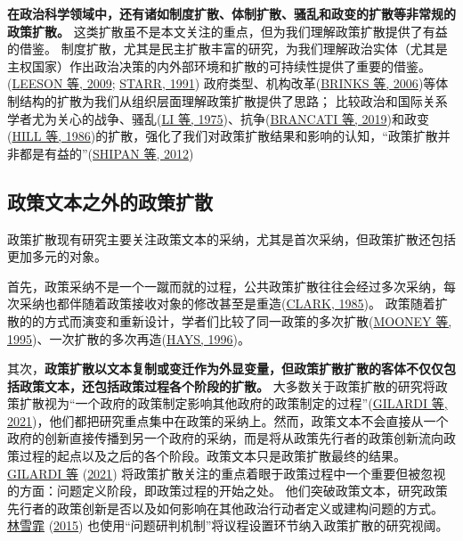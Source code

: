 \documentclass[
  12pt,
]{ctexart}
\begin{document}
\textbf{在政治科学领域中，还有诸如制度扩散、体制扩散、骚乱和政变的扩散等非常规的政策扩散。}
这类扩散虽不是本文关注的重点，但为我们理解政策扩散提供了有益的借鉴。
制度扩散，尤其是民主扩散丰富的研究，为我们理解政治实体（尤其是主权国家）作出政治决策的内外部环境和扩散的可持续性提供了重要的借鉴。(\protect\hyperlink{ref-LeesonDean2009}{LEESON 等, 2009}; \protect\hyperlink{ref-Starr1991}{STARR, 1991}) 政府类型、机构改革(\protect\hyperlink{ref-BrinksCoppedge2006}{BRINKS 等, 2006})等体制结构的扩散为我们从组织层面理解政策扩散提供了思路；
比较政治和国际关系学者尤为关心的战争、骚乱(\protect\hyperlink{ref-LiThompson1975}{LI 等, 1975})、抗争(\protect\hyperlink{ref-BrancatiLucardi2019}{BRANCATI 等, 2019})和政变(\protect\hyperlink{ref-HillRothchild1986}{HILL 等, 1986})的扩散，强化了我们对政策扩散结果和影响的认知，``政策扩散并非都是有益的''(\protect\hyperlink{ref-ShipanVolden2012}{SHIPAN 等, 2012})

\hypertarget{ux653fux7b56ux6587ux672cux4e4bux5916ux7684ux653fux7b56ux6269ux6563}{%
\subsection{政策文本之外的政策扩散}\label{ux653fux7b56ux6587ux672cux4e4bux5916ux7684ux653fux7b56ux6269ux6563}}

政策扩散现有研究主要关注政策文本的采纳，尤其是首次采纳，但政策扩散还包括更加多元的对象。

首先，政策采纳不是一个一蹴而就的过程，公共政策扩散往往会经过多次采纳，每次采纳也都伴随着政策接收对象的修改甚至是重造(\protect\hyperlink{ref-Clark1985}{CLARK, 1985})。
政策随着扩散的的方式而演变和重新设计，学者们比较了同一政策的多次扩散(\protect\hyperlink{ref-MooneyLee1995}{MOONEY 等, 1995})、一次扩散的多次再造(\protect\hyperlink{ref-Hays1996}{HAYS, 1996})。

其次，\textbf{政策扩散以文本复制或变迁作为外显变量，但政策扩散扩散的客体不仅仅包括政策文本，还包括政策过程各个阶段的扩散。}
大多数关于政策扩散的研究将政策扩散视为``一个政府的政策制定影响其他政府的政策制定的过程''(\protect\hyperlink{ref-GilardiEtAl2021}{GILARDI 等, 2021})，他们都把研究重点集中在政策的采纳上。然而，政策文本不会直接从一个政府的创新直接传播到另一个政府的采纳，而是将从政策先行者的政策创新流向政策过程的起点以及之后的各个阶段。政策文本只是政策扩散最终的结果。
\protect\hyperlink{ref-GilardiEtAl2021}{GILARDI 等} (\protect\hyperlink{ref-GilardiEtAl2021}{2021}) 将政策扩散关注的重点着眼于政策过程中一个重要但被忽视的方面：问题定义阶段，即政策过程的开始之处。 他们突破政策文本，研究政策先行者的政策创新是否以及如何影响在其他政治行动者定义或建构问题的方式。
\protect\hyperlink{ref-LinXueFei2015}{林雪霏} (\protect\hyperlink{ref-LinXueFei2015}{2015}) 也使用``问题研判机制''将议程设置环节纳入政策扩散的研究视阈。
\end{document}
